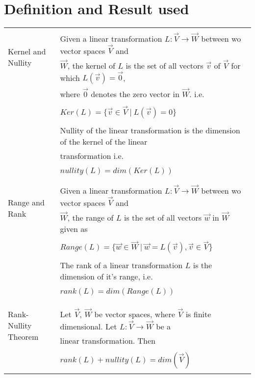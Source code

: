 \documentclass[journal,12pt]{IEEEtran}
\begin{document}
	\section{\textbf{Definition and Result used}}
	\begin{longtable}{|l|l|}
		\hline
		\multirow{3}{*}{Kernel and Nullity} 
		& \\
		& Given a linear transformation $L : \vec{V} \rightarrow \vec{W}$ between wo vector spaces $\vec{V}$ and \\ 
		& $\vec{W}$, the kernel of $L$ is the set of all vectors $\vec{v}$ of $\vec{V}$ for which $L(\vec{v}) = \vec{0}$, \\
		& where $\vec{0}$ denotes the zero vector in $\vec{W}$. i.e.\\
		& \\
		& \qquad \qquad \qquad $Ker(L) = \{\vec{v} \in \vec{V} \ |\ L(\vec{v}) = 0\}$ \\
		& \\
		& Nullity of the linear transformation is the dimension of the kernel of the linear \\
		& transformation i.e. \\
		& \\
		& \qquad \qquad \qquad $nullity(L) = dim(Ker(L))$ \\
		& \\
		\hline
		\multirow{3}{*}{Range and Rank} 
		& \\
		& Given a linear transformation $L : \vec{V} \rightarrow \vec{W}$ between wo vector spaces $\vec{V}$ and \\ 
		& $\vec{W}$, the range of $L$ is the set of all vectors $\vec{w}$ in $\vec{W}$ given as \\
		& \\
		& \qquad \qquad \qquad $Range(L) = \{\vec{w} \in \vec{W} \ |\ \vec{w} = L(\vec{v}), \vec{v} \in \vec{V}\}$ \\
		& \\
		& The rank of a linear transformation $L$ is the dimension of it's range, i.e. \\
		& \\
		& \qquad \qquad \qquad $rank(L) = dim(Range(L))$ \\
		& \\
		& \\
		\hline
		\multirow{3}{*}{Rank-Nullity Theorem} 
		& \\
		& Let $\vec{V}$, $\vec{W}$ be vector spaces, where $\vec{V}$ is finite dimensional. Let $L:\vec{V} \rightarrow \vec{W}$ be a \\
		& linear transformation. Then \\
		& \\
		&  \qquad \qquad  \qquad$rank(L) + nullity(L) = dim(\vec{V})$ \\
		& \\
		\hline
	\end{longtable}
\end{document}
